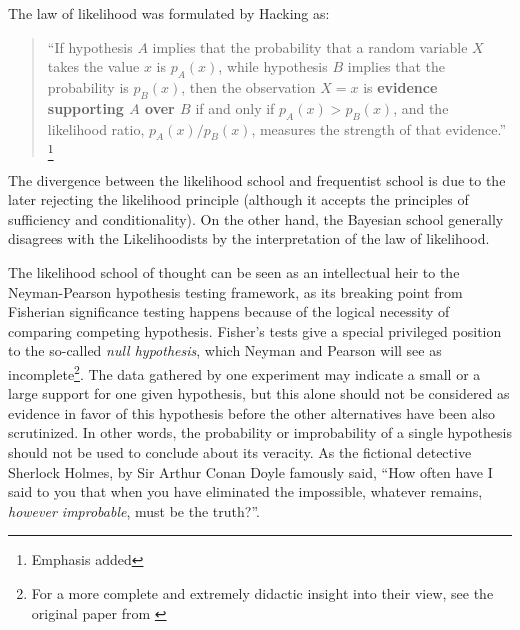 \documentclass[twoside,12pt,a4paper]{article}
\begin{document}
The law of likelihood was formulated by Hacking as:

\begin{quote}
``If hypothesis $A$ implies that the probability that a random variable $X$ takes the value $x$ 
is $p_A(x)$, while hypothesis $B$ implies that the probability is $p_B(x)$, then the observation $X=x$
is \textbf{evidence supporting $A$ over $B$} if and only if $p_A(x) > p_B(x)$, and the likelihood ratio, 
$p_A(x)/p_B(x)$, measures the strength of that evidence.''
\citep{Hacking65}\footnote{Emphasis added}
\end{quote}

The divergence between the likelihood school and frequentist school is due to the later rejecting the
likelihood principle (although it accepts the principles of sufficiency and conditionality). On the other 
hand, the Bayesian school generally disagrees with the Likelihoodists by the interpretation of the law of
likelihood.

The likelihood school of thought can be seen as an intellectual heir to the Neyman-Pearson hypothesis
testing framework, as its breaking point from Fisherian significance testing happens because of the
logical necessity of comparing competing hypothesis. Fisher's tests give a special privileged position
to the so-called {\em null hypothesis}, which Neyman and Pearson will see as incomplete\footnote{
For a more complete and extremely didactic insight into their view, see the original paper from 
\citep{Neyman1933}}. The data
gathered by one experiment may indicate a small or a large support for one given hypothesis, but this alone
should not be considered as evidence in favor of this hypothesis before the other alternatives have
been also scrutinized. In other words, the probability or improbability of a single hypothesis should not
be used to conclude about its veracity. As the fictional detective Sherlock Holmes, by Sir Arthur Conan
Doyle famously said, ``How often have I said to you that when you have eliminated the impossible, 
whatever remains, {\em however improbable}, must be the truth?''. 
\end{document}
